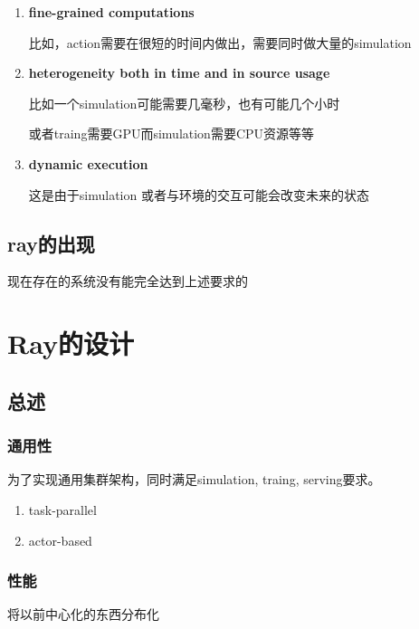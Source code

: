 \documentclass[]{article}
\begin{document}
\begin{enumerate}
\def\labelenumi{\arabic{enumi}.}
\item
  \textbf{fine-grained computations}

  比如，action需要在很短的时间内做出，需要同时做大量的simulation
\item
  \textbf{heterogeneity both in time and in source usage}

  比如一个simulation可能需要几毫秒，也有可能几个小时

  或者traing需要GPU而simulation需要CPU资源等等
\item
  \textbf{dynamic execution }

  这是由于simulation 或者与环境的交互可能会改变未来的状态
\end{enumerate}

\subsection{ray的出现}\label{header-n118}

现在存在的系统没有能完全达到上述要求的

\section{Ray的设计}\label{header-n120}

\subsection{总述}\label{header-n121}

\subsubsection{通用性}\label{header-n122}

为了实现通用集群架构，同时满足simulation, traing, serving要求。

\begin{enumerate}
\def\labelenumi{\arabic{enumi}.}
\item
  task-parallel
\item
  actor-based
\end{enumerate}

\subsubsection{性能}\label{header-n129}

将以前中心化的东西分布化
\end{document}
